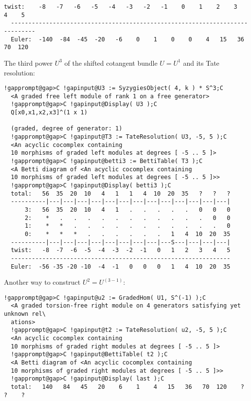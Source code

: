 \documentclass[a4paper,11pt]{report}
\begin{document}
{{{\begin{Verbatim}[commandchars=!@C,fontsize=\small,frame=single,label=Example]
  twist:    -8   -7   -6   -5   -4   -3   -2   -1    0    1    2    3    4    5
  -----------------------------------------------------------------------------
  Euler:  -140  -84  -45  -20   -6    0    1    0    0    4   15   36   70  120
\end{Verbatim}
 The third power $U^3$ of the shifted cotangent bundle $U=U^1$ and its Tate resolution: 
\begin{Verbatim}[commandchars=!@C,fontsize=\small,frame=single,label=Example]
  !gapprompt@gap>C !gapinput@U3 := SyzygiesObject( 4, k ) * S^3;C
  <A graded free left module of rank 1 on a free generator>
  !gapprompt@gap>C !gapinput@Display( U3 );C
  Q[x0,x1,x2,x3]^(1 x 1)
  
  (graded, degree of generator: 1)
  !gapprompt@gap>C !gapinput@T3 := TateResolution( U3, -5, 5 );C
  <An acyclic cocomplex containing
  10 morphisms of graded left modules at degrees [ -5 .. 5 ]>
  !gapprompt@gap>C !gapinput@betti3 := BettiTable( T3 );C
  <A Betti diagram of <An acyclic cocomplex containing 
  10 morphisms of graded left modules at degrees [ -5 .. 5 ]>>
  !gapprompt@gap>C !gapinput@Display( betti3 );C
  total:   56  35  20  10   4   1   1   4  10  20  35   ?   ?   ?
  ----------|---|---|---|---|---|---|---|---|---|---|---|---|---|
      3:   56  35  20  10   4   1   .   .   .   .   .   0   0   0
      2:    *   .   .   .   .   .   .   .   .   .   .   .   0   0
      1:    *   *   .   .   .   .   .   .   .   .   .   .   .   0
      0:    *   *   *   .   .   .   .   .   .   1   4  10  20  35
  ----------|---|---|---|---|---|---|---|---|---S---|---|---|---|
  twist:   -8  -7  -6  -5  -4  -3  -2  -1   0   1   2   3   4   5
  ---------------------------------------------------------------
  Euler:  -56 -35 -20 -10  -4  -1   0   0   0   1   4  10  20  35
\end{Verbatim}
 Another way to construct $U^2=U^(3-1)$: 
\begin{Verbatim}[commandchars=!@C,fontsize=\small,frame=single,label=Example]
  !gapprompt@gap>C !gapinput@u2 := GradedHom( U1, S^(-1) );C
  <A graded torsion-free right module on 4 generators satisfying yet unknown rel\
  ations>
  !gapprompt@gap>C !gapinput@t2 := TateResolution( u2, -5, 5 );C
  <An acyclic cocomplex containing
  10 morphisms of graded right modules at degrees [ -5 .. 5 ]>
  !gapprompt@gap>C !gapinput@BettiTable( t2 );C
  <A Betti diagram of <An acyclic cocomplex containing 
  10 morphisms of graded right modules at degrees [ -5 .. 5 ]>>
  !gapprompt@gap>C !gapinput@Display( last );C
  total:   140   84   45   20    6    1    4   15   36   70  120    ?    ?    ?

\end{Verbatim}}}}
\end{document}
